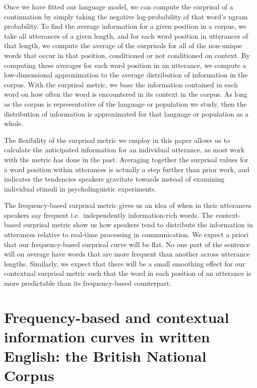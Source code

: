 \documentclass[man,floatsintext]{apa6}
\begin{document}
Once we have fitted our language model, we can compute the surprisal of a continuation by simply taking the negative log-probability of that word's ngram probability. To find the average information for a given position in a corpus, we take all utterances of a given length, and for each word position in utterances of that length, we compute the average of the surprisals for all of the non-unique words that occur in that position, conditioned or not conditioned on context. By computing these averages for each word position in an utterance, we compute a low-dimensional approximation to the average distribution of information in the corpus. With the surprisal metric, we base the information contained in each word on how often the word is encountered in its context in the corpus. As long as the corpus is representative of the language or population we study, then the distribution of information is approximated for that language or population as a whole.

The flexibility of the surprisal metric we employ in this paper allows us to calculate the anticipated information for an individual utterance, as most work with the metric has done in the past. Averaging together the surprisal values for a word position within utterances is actually a step further than prior work, and indicates the tendencies speakers gravitate towards instead of examining individual stimuli in psycholinguistic experiments.

The frequency-based surprisal metric gives us an idea of when in their utterances speakers say frequent i.e.~independently information-rich words. The context-based surprisal metric show us how speakers tend to distribute the information in utterances relative to real-time processing in communication. We expect a priori that our frequency-based surprisal curve will be flat. No one part of the sentence will on average have words that are more frequent than another across utterance lengths. Similarly, we expect that there will be a small smoothing effect for our contextual surprisal metric such that the word in each position of an utterance is more predictable than its frequency-based counterpart.

\hypertarget{frequency-based-and-contextual-information-curves-in-written-english-the-british-national-corpus}{%
\section{Frequency-based and contextual information curves in written English: the British National Corpus}\label{frequency-based-and-contextual-information-curves-in-written-english-the-british-national-corpus}}
\end{document}
